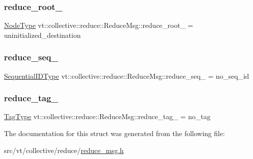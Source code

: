 \subsubsection{\texorpdfstring{reduce\+\_\+root\+\_\+}{reduce\_root\_}}
{\footnotesize\ttfamily \hyperlink{namespacevt_a866da9d0efc19c0a1ce79e9e492f47e2}{Node\+Type} vt\+::collective\+::reduce\+::\+Reduce\+Msg\+::reduce\+\_\+root\+\_\+ = uninitialized\+\_\+destination}

\mbox{\label{structvt_1_1collective_1_1reduce_1_1_reduce_msg_a875707afd8d9b7c7925dd8eda8d623e9}} 
\subsubsection{\texorpdfstring{reduce\+\_\+seq\+\_\+}{reduce\_seq\_}}
{\footnotesize\ttfamily \hyperlink{namespacevt_a3063d4db3b879d6dd2c7b8d50995c7f6}{Sequential\+I\+D\+Type} vt\+::collective\+::reduce\+::\+Reduce\+Msg\+::reduce\+\_\+seq\+\_\+ = no\+\_\+seq\+\_\+id}

\mbox{\label{structvt_1_1collective_1_1reduce_1_1_reduce_msg_ae095604d8e87dbd30f0aa0242a624fe8}} 
\subsubsection{\texorpdfstring{reduce\+\_\+tag\+\_\+}{reduce\_tag\_}}
{\footnotesize\ttfamily \hyperlink{namespacevt_a84ab281dae04a52a4b243d6bf62d0e52}{Tag\+Type} vt\+::collective\+::reduce\+::\+Reduce\+Msg\+::reduce\+\_\+tag\+\_\+ = no\+\_\+tag}



The documentation for this struct was generated from the following file\+:\begin{DoxyCompactItemize}
\item 
src/vt/collective/reduce/\hyperlink{reduce__msg_8h}{reduce\+\_\+msg.\+h}\end{DoxyCompactItemize}
